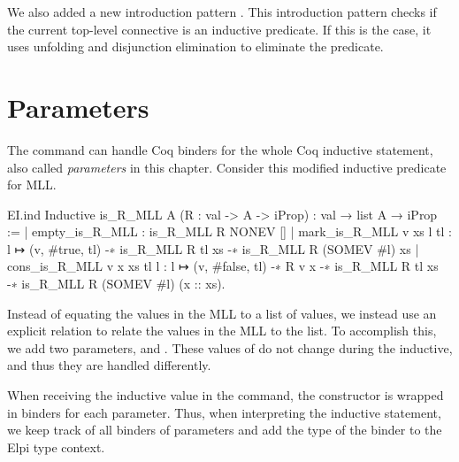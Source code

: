 \documentclass[thesis.tex]{subfiles}
\begin{document}
{We also added a new introduction pattern . This introduction pattern checks if the current top-level connective is an inductive predicate. If this is the case, it uses unfolding and disjunction elimination to eliminate the predicate.

\section{Parameters}\label{sec:parameters}
The  command can handle Coq binders for the whole Coq inductive statement, also called \emph{parameters} in this chapter. Consider this modified inductive predicate for MLL.
\begin{coqcode}
  EI.ind
  Inductive is_R_MLL {A} (R : val -> A -> iProp) :
                     val → list A → iProp :=
    | empty_is_R_MLL : is_R_MLL R NONEV []
    | mark_is_R_MLL v xs l tl : 
        l ↦ (v, #true, tl) -∗ is_R_MLL R tl xs -∗ 
        is_R_MLL R (SOMEV #l) xs
    | cons_is_R_MLL v x xs tl l : 
        l ↦ (v, #false, tl) -∗ R v x -∗ 
        is_R_MLL R tl xs -∗ 
        is_R_MLL R (SOMEV #l) (x :: xs).
\end{coqcode}
Instead of equating the values in the MLL to a list of values, we instead use an explicit relation to relate the values in the MLL to the list. To accomplish this, we add two parameters,  and . These values of  do not change during the inductive, and thus they are handled differently.

When receiving the inductive value in the command, the  constructor is wrapped in binders for each parameter. Thus, when interpreting the inductive statement, we keep track of all binders of parameters and add the type of the binder to the Elpi type context.

}
\end{document}
